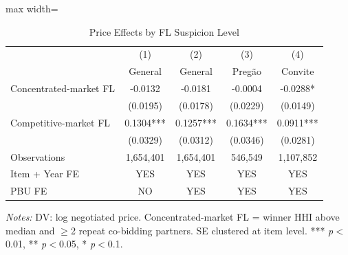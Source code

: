 \begin{table}[htbp]
\centering
\caption{Price Effects by FL Suspicion Level}
\label{tab:network_split}
\begin{adjustbox}{max width=\textwidth}
\begin{threeparttable}
\small
\begin{tabular}{lcccc}
\toprule
 & (1) & (2) & (3) & (4) \\
 & General & General & Preg\~{a}o & Convite \\
\midrule
Concentrated-market FL & -0.0132 & -0.0181 & -0.0004 & -0.0288* \\
 & (0.0195) & (0.0178) & (0.0229) & (0.0149) \\
Competitive-market FL & 0.1304*** & 0.1257*** & 0.1634*** & 0.0911*** \\
 & (0.0329) & (0.0312) & (0.0346) & (0.0281) \\
\midrule
Observations & 1,654,401 & 1,654,401 & 546,549 & 1,107,852 \\
Item + Year FE & YES & YES & YES & YES \\
PBU FE & NO & YES & YES & YES \\
\bottomrule
\end{tabular}
\begin{tablenotes}
\small
\item \textit{Notes:} DV: log negotiated price.
Concentrated-market FL = winner HHI above median and $\geq$2 repeat co-bidding partners.
SE clustered at item level.
*** \textit{p}$<$0.01, ** \textit{p}$<$0.05, * \textit{p}$<$0.1.
\end{tablenotes}
\end{threeparttable}
\end{adjustbox}
\end{table}
